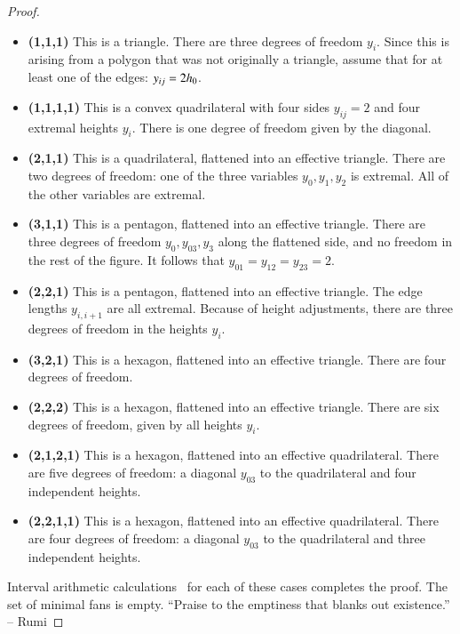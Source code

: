 \begin{proof}
\begin{itemize}
\item {\bf (1,1,1)}  This is a triangle.  There are three degrees of
freedom $y_i$.  Since this is arising from a polygon that was not originally a triangle,  assume that for at least one of the edges: $y_{ij}=2{h_0}$.
\item {\bf (1,1,1,1)}  This is a convex quadrilateral with four sides $y_{ij}=2$ and four extremal heights $y_i$.  There is one degree of freedom given by the diagonal.
\item {\bf (2,1,1)} This is a quadrilateral, flattened into an effective triangle.  There are two degrees of freedom: one of the three variables $y_0,y_1,y_2$ is extremal.  All of the other variables are extremal.
\item {\bf (3,1,1)}  This is a pentagon, flattened into an effective triangle.  There are three degrees of freedom $y_0,y_{03},y_3$ along the flattened side, and no freedom in the rest of the figure.  It follows that $y_{01}=y_{12}=y_{23}=2$.
\item {\bf (2,2,1)} This is a pentagon, flattened into an effective triangle.  The edge lengths $y_{i,i+1}$ are all extremal.  Because of height adjustments, there are three degrees of freedom in the heights $y_i$.
\item {\bf (3,2,1)} This is a hexagon, flattened into an effective triangle.  There are four degrees of freedom.
\item {\bf (2,2,2)}  This is a hexagon, flattened into an effective triangle.  There are six degrees of freedom, given by all heights $y_i$.
\item {\bf (2,1,2,1)} This is a hexagon, flattened into an effective quadrilateral.  There are five degrees of freedom: a diagonal $y_{03}$ to the quadrilateral and four independent heights.
\item {\bf (2,2,1,1)}  This is a hexagon, flattened into an effective quadrilateral.  There are four degrees of freedom: a diagonal $y_{03}$ to the quadrilateral and three independent heights.
%
%
%
%
\end{itemize}


Interval arithmetic calculations~\cite[cc:tau]{hales:2009:nonlinear} %
for each of these cases completes the proof.  The set of minimal fans is empty.  ``Praise to the emptiness that blanks out existence.'' -- Rumi %
\end{proof}

